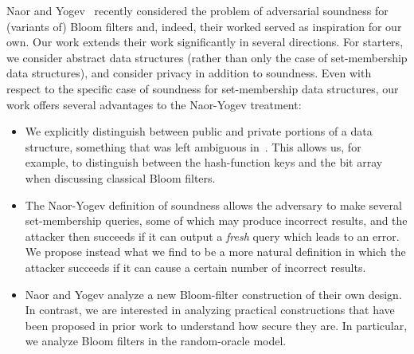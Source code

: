  Naor and
Yogev~\cite{naor2015bloom} recently considered the problem of
adversarial soundness for (variants of) Bloom filters and, indeed,
their worked served as inspiration for our own. Our work extends
their work significantly in several directions. For starters, we
consider abstract data structures (rather than only the case of
set-membership data structures), and consider privacy in addition to
soundness. Even with respect to the specific case of soundness for
set-membership data structures, our work offers several advantages
to the Naor-Yogev treatment:
\begin{itemize}
\item We explicitly distinguish between public and private
    portions of a data structure, something that was left
    ambiguous in~\cite{naor2015bloom}. This allows us, for
    example, to distinguish between the hash-function keys and
    the bit array when discussing classical Bloom filters.
\item The Naor-Yogev definition of soundness allows the
    adversary to make several set-membership queries, some of
    which may produce incorrect results, and the attacker then
    succeeds if it can output a \emph{fresh} query which leads
    to an error. We propose instead what we find to be a more
    natural definition in which the attacker succeeds if it can
    cause a certain number of incorrect results.
\item Naor and Yogev analyze a new Bloom-filter construction of
    their own design. In contrast, we are interested in
    analyzing practical constructions that have been proposed in
    prior work to understand how secure they are. In particular,
    we analyze Bloom filters in the random-oracle model.
\end{itemize}



